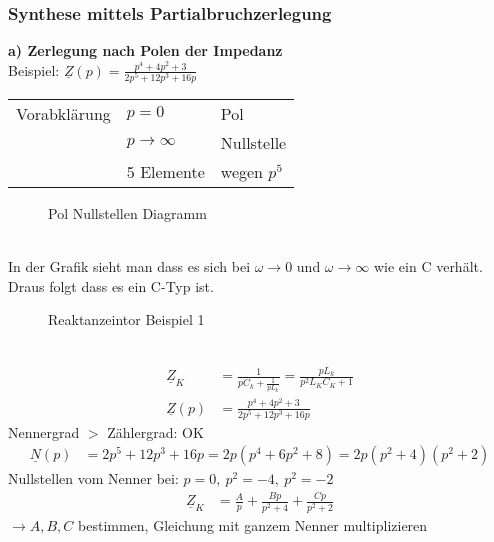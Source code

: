 \subsubsection{Synthese mittels Partialbruchzerlegung}
\textbf{a) Zerlegung nach Polen der Impedanz}\\
Beispiel: $\underline{Z}(p) = \frac{p^4+4p^2+3}{2p^5+12p^3+16p}$\\
\begin{tabular}{lll}
	Vorabklärung & $p=0$ & Pol \\
	& $p \rightarrow \infty$ & Nullstelle \\
	& 5 Elemente & wegen $p^5$ \\
\end{tabular}
\begin{figure}[!h]
	\centering
	
	\caption{Pol Nullstellen Diagramm}
	\label{fig:RetPolNullstelle}
\end{figure}\\
In der Grafik sieht man dass es sich bei $\omega \rightarrow 0$ und $\omega
\rightarrow \infty$ wie ein C verhält. Draus folgt dass es ein C-Typ ist.\\
\begin{figure}[!h]
	\centering
	
	\caption{Reaktanzeintor Beispiel 1}
	\label{fig:RetSyntheseBsp1S}
\end{figure}\\
\begin{align}
\underline{Z}_K&=\frac{1}{pC_k+\frac{1}{pL_k}} =
\frac{pL_k}{p^2L_KC_K+1}\nonumber\\
\underline{Z}(p)&=\frac{p^4+4p^2+3}{2p^5+12p^3+16p}\nonumber
\end{align}
Nennergrad $>$ Zählergrad: OK\\
\begin{align}
\underline{N}(p)&=2p^5+12p^3+16p=2p(p^4+6p^2+8)=2p(p^2+4)(p^2+2)\nonumber
\end{align}
Nullstellen vom Nenner bei: $p=0,\ p^2=-4,\ p^2=-2$\\
\begin{align}
\underline{Z}_K&=\frac{A}{p}+\frac{Bp}{p^2+4}+\frac{Cp}{p^2+2}\nonumber
\end{align}
$\rightarrow A,B,C$ bestimmen, Gleichung mit ganzem Nenner multiplizieren\\
